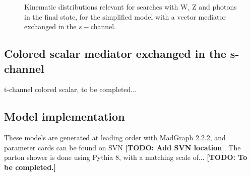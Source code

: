\begin{figure}[h!]
{    }
    \hfill
    \caption{Kinematic distributions relevant for searches with W, Z and photons in the final state,
    for the simplified model with a vector mediator exchanged in the $s-$channel.}
    \label{fig:DMV_EW_kinematics}
\end{figure}

\subsection{Colored scalar mediator exchanged in the s-channel}

t-channel colored scalar, to be completed...

\subsection{Model implementation}

These models are generated at leading order with MadGraph 2.2.2, and parameter
cards can be found on SVN \textbf{[TODO: Add SVN location]}.
The parton shower is done using Pythia 8, with a matching scale of...
\textbf{[TODO: To be completed.]}
